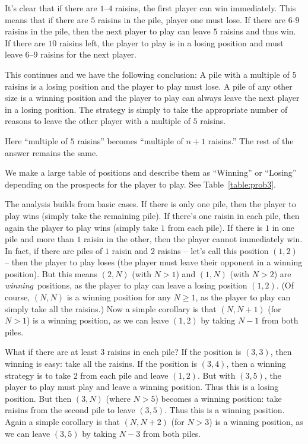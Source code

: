 \documentclass[12pt,letterpaper]{article}
\begin{document}


\newpage
{}
\lhead{}
\rhead{}
\thispagestyle{fancy}
\begin{enumerate}
  \Answer 
  It's clear that if there are $1$--$4$ raisins, the first player can
  win immediately.  This means that if there are $5$ raisins in the
  pile, player one must lose.  If there are $6$-$9$ raisins in the
  pile, then the next player to play can leave $5$ raisins and thus
  win.  If there are $10$ raisins left, the player to play is in a
  losing position and must leave $6$--$9$ raisins for the next
  player. 

  This continues and we have the following conclusion: A pile with a
  multiple of $5$ raisins is a losing position and the player to play
  must lose.  A pile of any other size is a winning position and the
  player to play can always leave the next player in a losing
  position.  The strategy is simply to take the appropriate number of
  reasons to leave the other player with a multiple of $5$ raisins.

  \Answer
  Here ``multiple of $5$ raisins'' becomes ``multiple of $n+1$
  raisins.''  The rest of the answer remains the same.

  \Answer We make a large table of positions and describe them as
  ``Winning'' or ``Losing'' depending on the prospects for the player
  to play.  See Table~\ref{table:prob3}.


  The analysis builds from basic cases.  If there is only one pile,
  then the player to play wins (simply take the remaining pile).  If
  there's one raisin in each pile, then again the player to play wins
  (simply take $1$ from each pile).  If there is $1$ in one pile and
  more than $1$ raisin in the other, then the player cannot
  immediately win.  In fact, if there are piles of $1$ raisin and $2$
  raisins -- let's call this position $(1,2)$ -- then the player to
  play loses (the player must leave their opponent in a winning
  position).  But this means $(2,N)$ (with $N>1$) and $(1,N)$ (with $N>2$) are
  \emph{winning}\ positions, as the player to play can leave a losing
  position $(1,2)$.  (Of course, $(N,N)$ is a winning position for any
  $N\ge1$, as the player to play can simply take all the raisins.)
  Now a simple corollary is that $(N,N+1)$ (for $N>1$) is a winning
  position, as we can leave $(1,2)$ by taking $N-1$ from both piles.

  What if there are at least $3$ raisins in each pile?  If the
  position is $(3,3)$, then winning is easy: take all the raisins.  If
  the position is $(3,4)$, then a winning strategy is to take $2$ from
  each pile and leave $(1,2)$.  But with $(3,5)$, the player to play
  must play and leave a winning position.  Thus this is a losing
  position.  But then $(3,N)$ (where $N>5$) becomes a winning
  position: take raisins from the second pile to leave $(3,5)$.  Thus
  this is a winning position.  Again a simple corollary is that
  $(N,N+2)$ (for $N>3$) is a winning position, as we can leave $(3,5)$
  by taking $N-3$ from both piles.


\end{enumerate}
\end{document}
